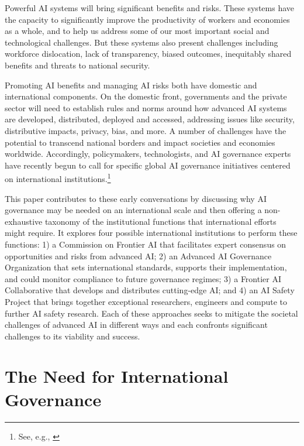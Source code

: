 \documentclass[12pt]{article}
\begin{document}
Powerful AI systems will bring significant benefits and risks. These
systems have the capacity to significantly improve the productivity of
workers and economies as a whole, and to help us address some of our
most important social and technological challenges. But these systems
also present challenges including workforce dislocation, lack of
transparency, biased outcomes, inequitably shared benefits and threats
to national security.

Promoting AI benefits and managing AI risks both have domestic and
international components. On the domestic front, governments and the
private sector will need to establish rules and norms around how
advanced AI systems are developed, distributed, deployed and accessed,
addressing issues like security, distributive impacts, privacy, bias,
and more. A number of challenges have the potential to transcend
national borders and impact societies and economies worldwide.
Accordingly, policymakers, technologists, and AI governance experts have
recently begun to call for specific global AI governance initiatives
centered on international institutions.\footnote{See, e.g., \cite{noauthor_secretary-general_2023, noauthor_elders_2023, dubner_satya_nodate, rees_g20_2023, chowdhury_ai_2023, kakkad_new_2023, hogarth_we_2023}}

This paper contributes to these early conversations by discussing why AI
governance may be needed on an international scale and then offering a
non-exhaustive taxonomy of the institutional functions that
international efforts might require. It explores four possible
international institutions to perform these functions: 1) a Commission
on Frontier AI that facilitates expert consensus on opportunities and
risks from advanced AI; 2) an Advanced AI Governance Organization that
sets international standards, supports their implementation, and could
monitor compliance to future governance regimes; 3) a Frontier AI
Collaborative that develops and distributes cutting-edge AI; and 4) an
AI Safety Project that brings together exceptional researchers,
engineers and compute to further AI safety research. Each of these
approaches seeks to mitigate the societal challenges of advanced AI in
different ways and each confronts significant challenges to its
viability and success.


\section{The Need for International Governance
}
\end{document}
